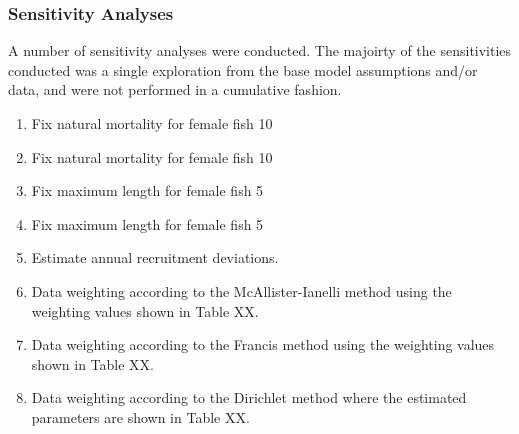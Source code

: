 \documentclass[11pt,
  english,
  a4paper,
]{article}
\begin{document}
\leavevmode\tagmcend\tagstructend\par


\hypertarget{sensitivity-analyses}{%
\subsubsection{Sensitivity Analyses}\label{sensitivity-analyses}}

\leavevmode\tagmcend\tagstructend


A number of sensitivity analyses were conducted. The majoirty of the sensitivities conducted was a single exploration from the base model assumptions and/or data, and were not performed in a cumulative fashion.

\leavevmode\tagmcend\tagstructend\par

\begin{enumerate}

  \item Fix natural mortality for female fish 10%
  
  \item Fix natural mortality for female fish 10%
  
  \item Fix maximum length for female fish 5%

  \item Fix maximum length for female fish 5%
    
  \item Estimate annual recruitment deviations. 
  
  \item Data weighting according to the McAllister-Ianelli method using the weighting values shown in Table XX. 

  \item Data weighting according to the Francis method using the weighting values shown in Table XX. 
  
  \item Data weighting according to the Dirichlet method where the estimated parameters are shown in Table XX. 
  
\end{enumerate}

\end{document}
